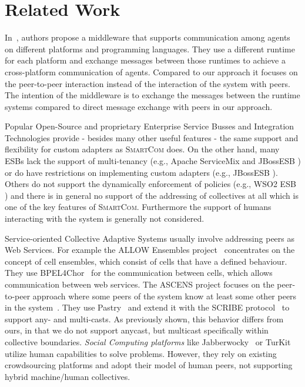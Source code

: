 \documentclass{llncs}
\newcommand{\mdl}{\textsc{SmartCom}}
\begin{document}
\section{Related Work}
\label{sec:relwork}
  
	
  In~\cite{Cabri1}, authors propose a middleware that supports communication among agents on different platforms and programming languages. They use a different runtime for each platform and exchange messages between those runtimes to achieve a cross-platform communication of agents. Compared to our approach it focuses on the peer-to-peer interaction instead of the interaction of the system with peers. The intention of the middleware is to exchange the messages between the runtime systems compared to direct message exchange with peers in our approach.
  
  Popular Open-Source and proprietary Enterprise Service Busses and Integration Technologies provide - besides many other useful features - the same support and flexibility for custom adapters as \mdl{} does. On the other hand, many ESBs lack the support of multi-tenancy (e.g., Apache ServiceMix \cite{ApacheServiceMix} and JBossESB \cite{JBoss}) or do have restrictions on implementing custom adapters (e.g., JBossESB \cite{JBoss}). Others do not support the dynamically enforcement of policies (e.g., WSO2 ESB \cite{WSO2}) and there is in general no support of the addressing of collectives at all which is one of the key features of \mdl{}. Furthermore the support of humans interacting with the system is generally not considered.

  Service-oriented Collective Adaptive Systems usually involve addressing peers as Web Services. For example the ALLOW Ensembles project~\cite{Andrikopoulos} concentrates on the concept of cell ensembles, which consist of cells that have a defined behaviour. They use BPEL4Chor~\cite{BPEL4Chor} for the communication between cells, which allows communication between web services. 
  The ASCENS project focuses on the peer-to-peer approach where some peers of the system know at least some other peers in the system~\cite{AutonomicCloud}. They use Pastry~\cite{Pastry} and extend it with the SCRIBE protocol~\cite{Scribe} to support any- and multi-casts. As previously shown, this behavior differs from ours, in that we do not support anycast, but multicast specifically within collective boundaries.
  \emph{Social Computing platforms} like Jabberwocky~\cite{Jabberwocky} or TurKit~\cite{Turkit} utilize human capabilities to solve problems. However, they rely on existing crowdsourcing platforms and adopt their model of human peers, not supporting hybrid machine/human collectives.
\end{document}
